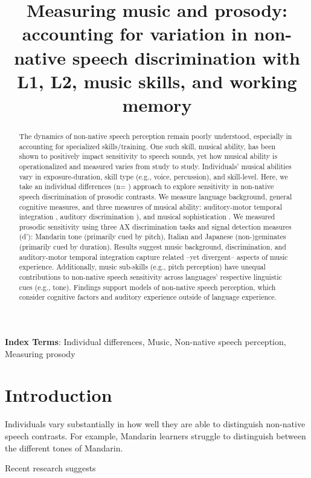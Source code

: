 \documentclass[a4paper]{article}
\title{Measuring music and prosody: accounting for variation in non-native speech discrimination with L1, L2, music skills, and working memory}
\newcommand{\livedata}[2]{%
    \DTLfetch{#1}{Statistic}{#2}{Value}%
}
\begin{document}
\maketitle
% 
\begin{abstract}
The dynamics of non-native speech perception remain poorly understood, especially in accounting for specialized skills/training. One such skill, musical ability, has been shown to positively impact sensitivity to speech sounds, yet how musical ability is operationalized and measured varies from study to study. Individuals’ musical abilities vary in exposure-duration, skill type (e.g., voice, percussion), and skill-level. Here, we take an individual differences (n=\livedata{partrem}{kept_participants}) approach to explore sensitivity in non-native speech discrimination of prosodic contrasts. We measure language background, general cognitive measures, and three measures of musical ability: auditory-motor temporal integration \cite{Kachlicka_Saito_Tierney_2019}, auditory discrimination \cite[MET;]{Wallentin_Nielsen_Friis-Olivarius_Vuust_Vuust_2010}), and musical sophistication \cite[Gold-MSI;]{Müllensiefen_Gingras_Musil_Stewart_2014}. We measured prosodic sensitivity using three AX discrimination tasks and signal detection measures (d'): Mandarin tone (primarily cued by pitch), Italian and Japanese (non-)geminates (primarily cued by duration). Results suggest music background, discrimination, and auditory-motor temporal integration capture related –yet divergent– aspects of music experience. Additionally, music sub-skills (e.g., pitch perception) have unequal contributions to non-native speech sensitivity across languages' respective linguistic cues (e.g., tone). Findings support models of non-native speech perception, which consider cognitive factors and auditory experience outside of language experience.

\end{abstract}
\noindent\textbf{Index Terms}:  Individual differences, Music, Non-native speech perception, Measuring prosody
\section{Introduction}

Individuals vary substantially in how well they are able to distinguish non-native speech contrasts. For example, Mandarin learners struggle to distinguish between the different tones of Mandarin. 

Recent research suggests
\end{document}
